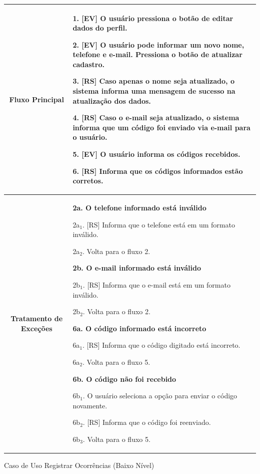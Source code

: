 \begin{apendicesenv}
\begin{quadro}[htb]
\begin{tabular}{|c|p{11cm}|}
		\textbf{Fluxo Principal} &
		\parbox[t]{11cm}{
			\raggedright
			1. [EV] O usuário pressiona o botão de editar dados do perfil.\par
			2. [EV] O usuário pode informar um novo nome, telefone e e-mail. Pressiona o botão de atualizar cadastro.\par
			3. [RS] Caso apenas o nome seja atualizado, o sistema informa uma mensagem de sucesso na atualização dos dados.\par
			4. [RS] Caso o e-mail seja atualizado, o sistema informa que um código foi enviado via e-mail para o usuário.\par
			5. [EV] O usuário informa os códigos recebidos.\par
			6. [RS] Informa que os códigos informados estão corretos.
		}
		\\ \hline
		
		\textbf{Tratamento de Exceções} &
		\parbox[t]{11cm}{
			\raggedright
			\textbf{2a. O telefone informado está inválido}\par
			2a$_1$. [RS] Informa que o telefone está em um formato inválido.\par
			2a$_2$. Volta para o fluxo 2.\par
			
			\textbf{2b. O e-mail informado está inválido}\par
			2b$_1$. [RS] Informa que o e-mail está em um formato inválido.\par
			2b$_2$. Volta para o fluxo 2.\par
			
			\textbf{6a. O código informado está incorreto}\par
			6a$_1$. [RS] Informa que o código digitado está incorreto.\par
			6a$_2$. Volta para o fluxo 5.\par
			
			\textbf{6b. O código não foi recebido}\par
			6b$_1$. O usuário seleciona a opção para enviar o código novamente.\par
			6b$_2$. [RS] Informa que o código foi reenviado.\par
			6b$_3$. Volta para o fluxo 5.
		}
		\\ \hline
	\end{tabular}
	
\end{quadro}
\begin{quadro}[htb]
	\centering
	\caption{\label{quadro_rfu07}Caso de Uso Registrar Ocorrências (Baixo Nível)}
	\small
	\renewcommand{\arraystretch}{1.1}
	

\end{quadro}
\end{apendicesenv}
